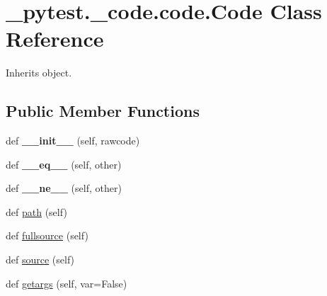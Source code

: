 \hypertarget{class__pytest_1_1__code_1_1code_1_1_code}{}\section{\+\_\+pytest.\+\_\+code.\+code.\+Code Class Reference}
\label{class__pytest_1_1__code_1_1code_1_1_code}


Inherits object.

\subsection*{Public Member Functions}
\begin{DoxyCompactItemize}
\item 
\mbox{\label{class__pytest_1_1__code_1_1code_1_1_code_a855d0ce0a318ac6522a22c495722004d}} 
def {\bfseries \+\_\+\+\_\+init\+\_\+\+\_\+} (self, rawcode)
\item 
\mbox{\label{class__pytest_1_1__code_1_1code_1_1_code_a64e1a3e03bdc51f8cf5e66fa6438e854}} 
def {\bfseries \+\_\+\+\_\+eq\+\_\+\+\_\+} (self, other)
\item 
\mbox{\label{class__pytest_1_1__code_1_1code_1_1_code_a98444ac294cb46c7a00b896f101399bc}} 
def {\bfseries \+\_\+\+\_\+ne\+\_\+\+\_\+} (self, other)
\item 
def \hyperlink{class__pytest_1_1__code_1_1code_1_1_code_a026b60b74a3205adcfc8216f1ba5d1f9}{path} (self)
\item 
def \hyperlink{class__pytest_1_1__code_1_1code_1_1_code_a9e8e8b252337ba9d050e0fe2546d2d0c}{fullsource} (self)
\item 
def \hyperlink{class__pytest_1_1__code_1_1code_1_1_code_ac44c9a145c7636c7c90bb394fe75dce9}{source} (self)
\item 
def \hyperlink{class__pytest_1_1__code_1_1code_1_1_code_a6c188b13651220697432afc00f320f18}{getargs} (self, var=False)
\end{DoxyCompactItemize}
